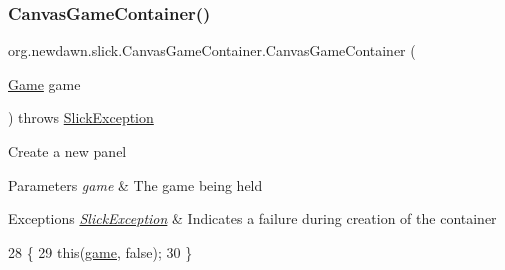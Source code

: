 \subsubsection{\texorpdfstring{Canvas\+Game\+Container()}{CanvasGameContainer()}\hspace{0.1cm}{\footnotesize\ttfamily [1/2]}}
{\footnotesize\ttfamily org.\+newdawn.\+slick.\+Canvas\+Game\+Container.\+Canvas\+Game\+Container (\begin{DoxyParamCaption}\item[{\mbox{\hyperlink{interfaceorg_1_1newdawn_1_1slick_1_1_game}{Game}}}]{game }\end{DoxyParamCaption}) throws \mbox{\hyperlink{classorg_1_1newdawn_1_1slick_1_1_slick_exception}{Slick\+Exception}}\hspace{0.3cm}{\ttfamily [inline]}}

Create a new panel


\begin{DoxyParams}{Parameters}
{\em game} & The game being held \\
\hline
\end{DoxyParams}

\begin{DoxyExceptions}{Exceptions}
{\em \mbox{\hyperlink{classorg_1_1newdawn_1_1slick_1_1_slick_exception}{Slick\+Exception}}} & Indicates a failure during creation of the container \\
\hline
\end{DoxyExceptions}

\begin{DoxyCode}
28                                                                 \{
29         \textcolor{keyword}{this}(\mbox{\hyperlink{classorg_1_1newdawn_1_1slick_1_1_canvas_game_container_aea0c3147fede8b9e57819fbee5c50612}{game}}, \textcolor{keyword}{false});
30     \}
\end{DoxyCode}
\mbox{\label{classorg_1_1newdawn_1_1slick_1_1_canvas_game_container_a130d50eaef52d7e4cbab1ff365606498}} 
